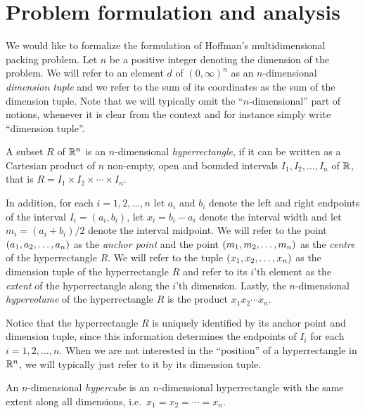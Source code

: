 \section{Problem formulation and analysis}
\noindent We would like to formalize the formulation of Hoffman's multidimensional packing problem. Let $n$ be a positive integer denoting the dimension of the problem. We will refer to an element $d$ of $(0, \infty)^n$ as an $n$-dimensional \textit{dimension tuple} and we refer to the sum of its coordinates as the sum of the dimension tuple. Note that we will typically omit the ``$n$-dimensional'' part of notions, whenever it is clear from the context and for instance simply write ``dimension tuple''.

\begin{definition}[Hyperrectangle]
A subset $R$ of $\mathbb{R}^n$ is an $n$-dimensional \textit{hyperrectangle}, if it can be written as a Cartesian product of $n$ non-empty, open and bounded intervals $I_1, I_2, \dotsc, I_n$ of $\mathbb{R}$, that is $R = I_1 \times I_2 \times \dotsb \times I_n$.
\end{definition}

\noindent In addition, for each $i = 1, 2, \dotsc, n$ let $a_i$ and $b_i$ denote the left and right endpoints of the interval $I_i = (a_i, b_i)$, let $x_i = b_i - a_i$ denote the interval width and let $m_i = (a_i + b_i)/2$ denote the interval midpoint. We will refer to the point $\left( a_1, a_2, \dotsc, a_n \right)$ as the \textit{anchor point} and the point $\left( m_1, m_2, \dotsc, m_n \right)$ as the \textit{centre} of the hyperrectangle $R$. We will refer to the tuple $\left( x_1, x_2, \dotsc, x_n \right)$ as the dimension tuple of the hyperrectangle $R$ and refer to its $i$'th element as the \textit{extent} of the hyperrectangle along the $i$'th dimension. Lastly, the $n$-dimensional \textit{hypervolume} of the hyperrectangle $R$ is the product $x_1 x_2 \dotsm x_n$.

Notice that the hyperrectangle $R$ is uniquely identified by its anchor point and dimension tuple, since this information determines the endpoints of $I_i$ for each $i = 1, 2, \dotsc, n$. When we are not interested in the ``position'' of a hyperrectangle in $\mathbb{R}^n$, we will typically just refer to it by its dimension tuple.

\begin{definition}[Hypercube]
An $n$-dimensional \textit{hypercube} is an $n$-dimensional hyperrectangle with the same extent along all dimensions, i.e.\ $x_1 = x_2 = \dotsb = x_n$.
\end{definition}

